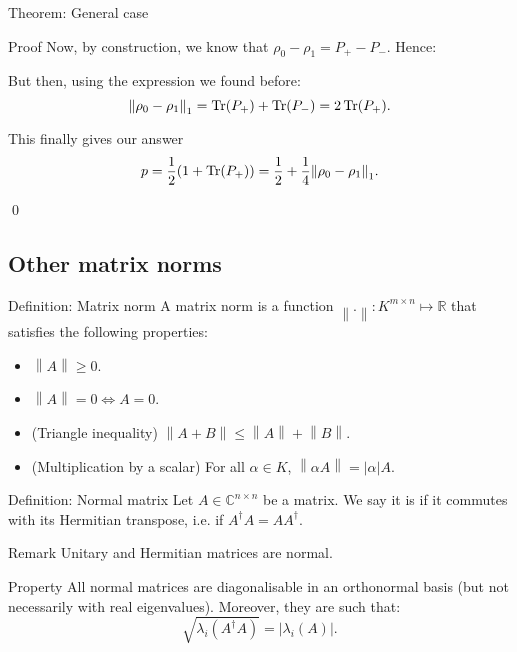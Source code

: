 \documentclass[a4paper]{article}
\begin{document}
\begin{parag}{Theorem: General case}
\begin{subparag}{Proof}
        Now, by construction, we know that $\rho_0 - \rho_1= P_+ - P_-$. Hence:  
        
        But then, using the expression we found before:
        \[\left\|\rho_0 - \rho_1\right\|_1 = \Tr\left(P_+\right) + \Tr\left(P_-\right) = 2\Tr\left(P_+\right).\]

        This finally gives our answer 
        \[p = \frac{1}{2}\left(1 + \Tr\left(P_+\right)\right) = \frac{1}{2} + \frac{1}{4} \left\|\rho_0 - \rho_1\right\|_1.\]
        
        \qed
    \end{subparag}
\end{parag}

\subsection{Other matrix norms}

\begin{parag}{Definition: Matrix norm}
    A matrix norm is a function $\left\|.\right\|: K^{m \times n} \mapsto \mathbb{R}$ that satisfies the following properties:
    \begin{itemize}
        \item $\left\|A\right\| \geq 0$.
        \item $\left\|A\right\| = 0 \iff A = 0$.
        \item (Triangle inequality) $\left\|A + B\right\| \leq \left\|A\right\| + \left\|B\right\|.$
        \item (Multiplication by a scalar) For all $\alpha \in K$, $\left\|\alpha A\right\| = \left|\alpha\right| A$.
    \end{itemize}
     
\end{parag}

\begin{parag}{Definition: Normal matrix}
    Let $A \in \mathbb{C}^{n \times n}$ be a matrix. We say it is  if it commutes with its Hermitian transpose, i.e. if $A^{\dagger} A = A A ^{\dagger}$.
     
    \begin{subparag}{Remark}
        Unitary and Hermitian matrices are normal.
    \end{subparag}

    \begin{subparag}{Property}
        All normal matrices are diagonalisable in an orthonormal basis (but not necessarily with real eigenvalues). Moreover, they are such that:  
        \[\sqrt{\lambda_i\left(A^{\dagger} A\right)} = \left|\lambda_i\left(A\right)\right|.\]
    \end{subparag}
\end{parag}
\end{document}
